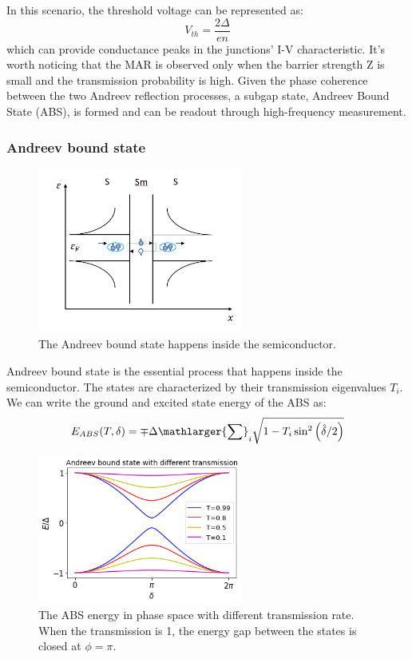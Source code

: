 In this scenario, the threshold voltage can be represented as:
\begin{equation}
    V_{th} = \frac{2\Delta}{en}
\end{equation}
which can provide conductance peaks in the junctions' I-V characteristic. It's worth noticing that the MAR is observed only when the barrier strength Z is small and the transmission probability is high. Given the phase coherence between the two Andreev reflection processes, a subgap state, Andreev Bound State (ABS), is formed and can be readout through high-frequency measurement\cite{RN51}.

\subsubsection{Andreev bound state}
\begin{figure}[h!]
    \centering
    \includegraphics[width=0.6\textwidth]{Pic/ABS.png}
    \caption{The Andreev bound state happens inside the semiconductor.}
    \label{fig:my_label}
\end{figure}
Andreev bound state is the essential process that happens inside the semiconductor. The states are characterized by their transmission eigenvalues ${T_i}$\cite{RN78}. We can write the ground and excited state energy of the ABS as:
\begin{equation}
    E_{ABS}(T, \delta) = \mp \Delta \mathlarger{\sum}_i\sqrt{1-T_i\sin^2{\left(\hat{\delta}/2\right)}}
\end{equation}
\begin{figure}[h!]
    \centering
    \includegraphics[width=0.6\textwidth]{Pic/ABS_transmission.png}
    \caption{The ABS energy in phase space with different transmission rate. When the transmission is 1, the energy gap between the states is closed at $\phi = \pi$. }
    \label{fig:my_label}
\end{figure}

